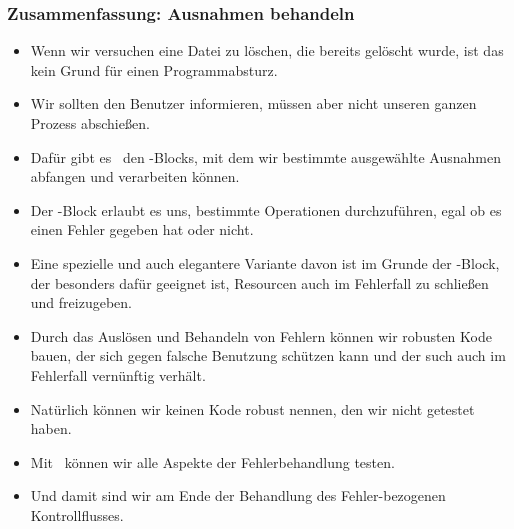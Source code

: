 \documentclass[aspectratio=169,mathserif,notheorems]{beamer}%
\begin{document}
\begin{frame}%
\frametitle{Zusammenfassung: Ausnahmen behandeln}%
\begin{itemize}%
%
%
\item<2-> Wenn wir versuchen eine Datei zu löschen, die bereits gelöscht wurde, ist das kein Grund für einen Programmabsturz.%
%
\item<3-> Wir sollten den Benutzer informieren, müssen aber nicht unseren ganzen Prozess abschießen.%
%
\item<4-> Dafür gibt es \DEzB\ den -Blocks, mit dem wir bestimmte ausgewählte Ausnahmen abfangen und verarbeiten können.%
%
\item<5-> Der -Block erlaubt es uns, bestimmte Operationen durchzuführen, egal ob es einen Fehler gegeben hat oder nicht.%
%
\item<6-> Eine spezielle und auch elegantere Variante davon ist im Grunde der -Block, der besonders dafür geeignet ist, Resourcen auch im Fehlerfall zu schließen und freizugeben.
%
\item<7-> Durch das Auslösen und Behandeln von Fehlern können wir robusten Kode bauen, der sich gegen falsche Benutzung schützen kann und der such auch im Fehlerfall vernünftig verhält.%
%
\item<8-> Natürlich können wir keinen Kode robust nennen, den wir nicht getestet haben.%
%
\item<9-> Mit \pytest\ können wir alle Aspekte der Fehlerbehandlung testen.%
%
\item<10-> Und damit sind wir am Ende der Behandlung des Fehler-bezogenen Kontrollflusses.%
%
\end{itemize}%
\end{frame}%
%
\endPresentation%
\end{document}
